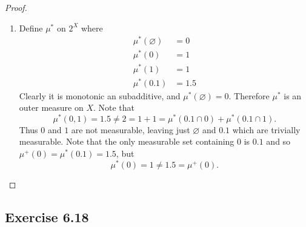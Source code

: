 \documentclass[hw_all.tex]{subfiles}
\begin{document}
\begin{proof}
\begin{enumerate}
        \item
            Define $\mu^*$ on $2^X$ where
            \begin{align*}
                \mu^*(\varnothing) &= 0 \\ 
                \mu^*(\qty{0}) &= 1 \\ 
                \mu^*(\qty{1}) &= 1 \\ 
                \mu^*(\qty{0,1}) &= 1.5
            \end{align*}
            Clearly it is monotonic an subadditive, and $\mu^*(\varnothing) = 0$. Therefore $\mu^*$ is an outer measure on $X$. Note that
            \[
                \mu^*({0,1}) = 1.5 \neq 2 = 1 + 1 = \mu^*(\qty{0,1} \cap \qty{0}) + \mu^*(\qty{0,1} \cap \qty{1})
            .\]
            Thus $\qty{0}$ and $\qty{1}$ are not measurable, leaving just $\varnothing$ and $\qty{0,1}$ which are trivially measurable. Note that the only measurable set containing $\qty{0}$ is $\qty{0,1}$ and so $\mu^+(\qty{0}) = \mu^*(\qty{0,1}) = 1.5$, but
            \[
                \mu^*(\qty{0}) = 1 \neq 1.5 = \mu^+(\qty{0})
            .\]
    \end{enumerate}
\end{proof}

\subsection{Exercise 6.18}
\end{document}
